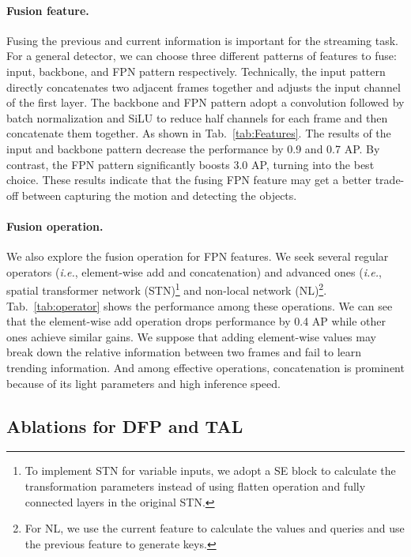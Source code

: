 \documentclass[10pt,twocolumn,letterpaper]{article}
\begin{document}
\paragraph{Fusion feature.} Fusing the previous and current information is important for the streaming task. For a general detector, we can choose three different patterns of features to fuse: input, backbone, and FPN pattern respectively. Technically, the input pattern directly concatenates two adjacent frames together and adjusts the input channel of the first layer. The backbone and FPN pattern adopt a  convolution followed by batch normalization and SiLU to reduce half channels for each frame and then concatenate them together. As shown in Tab.~\ref{tab:Features}. The results of the input and backbone pattern decrease the performance by 0.9 and 0.7 AP. By contrast, the FPN pattern significantly boosts 3.0 AP, turning into the best choice. These results indicate that the fusing FPN feature may get a better trade-off between capturing the motion and detecting the objects.

\paragraph{Fusion operation.} We also explore the fusion operation for FPN features. We seek several regular operators (\emph{i.e.}, element-wise add and concatenation) and advanced ones (\emph{i.e.}, spatial transformer network \cite{stn} (STN)\footnote{To implement STN for variable inputs, we adopt a SE \cite{senet} block to calculate the transformation parameters instead of using flatten operation and fully connected layers in the original STN.} and non-local network \cite{nonlocal} (NL)\footnote{For NL, we use the current feature to calculate the values and queries and use the previous feature to generate keys.}. Tab.~\ref{tab:operator} shows the performance among these operations. We can see that the element-wise add operation drops performance by 0.4 AP while other ones achieve similar gains. We suppose that adding element-wise values may break down the relative information between two frames and fail to learn trending information. And among effective operations, concatenation is prominent because of its light parameters and high inference speed.


\subsection{Ablations for DFP and TAL}
\end{document}
